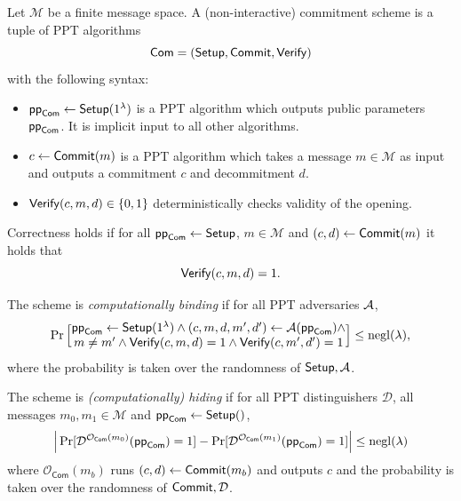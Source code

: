 \begin{definition}\label{def:commitment-scheme}
Let $\mathcal{M}$ be a finite message space. A (non-interactive) commitment scheme is a tuple of PPT algorithms
\[
  \mathsf{Com}=(\mathsf{Setup},\mathsf{Commit},\mathsf{Verify})
\]
with the following syntax:
\begin{itemize}[leftmargin=1.25em]
  \item $\mathsf{pp}_{\mathsf{Com}}\gets \mathsf{Setup}(1^\lambda)$ is a PPT algorithm which outputs public parameters $\mathsf{pp}_{\mathsf{Com}}$. It is implicit input to all other algorithms.
  \item $c \gets \mathsf{Commit}(m)$ is a PPT algorithm which takes a message $m\in\mathcal{M}$ as input and outputs a commitment $c$ and decommitment $d$.
  \item $\mathsf{Verify}(c,m,d)\in\{0,1\}$ deterministically checks validity of the opening.
\end{itemize}
Correctness holds if for all $\mathsf{pp}_{\mathsf{Com}}\gets \mathsf{Setup}$,  $m\in \mathcal{M}$ and $(c,d)\gets \mathsf{Commit}(m)$ it holds that
\[
  \mathsf{Verify}(c,m,d)=1.
\]

The scheme is \emph{computationally binding} if for all PPT adversaries $\mathcal{A}$,
\[
  \Pr\Big[\begin{matrix}
  	\mathsf{pp}_{\mathsf{Com}} \gets \mathsf{Setup}(1^\lambda) \wedge (c,m,d,m',d')\gets \mathcal{A}(\mathsf{pp}_{\mathsf{Com}}) \wedge  \\
  	m\neq m' \wedge \mathsf{Verify}(c,m,d)=1 \wedge \mathsf{Verify}(c,m',d')=1
  \end{matrix}
   \Big]\le \mathrm{negl}(\lambda),
\]
where the probability is taken over the randomness of $\mathsf{Setup},\mathcal{A}$.

The scheme is \emph{(computationally) hiding} if for all PPT distinguishers $\mathcal{D}$, all 
messages $m_0,m_1\in\mathcal{M}$ and $\mathsf{pp}_{\mathsf{Com}}\gets \mathsf{Setup}()$,
\[
  \Big|\Pr[\mathcal{D}^{\mathcal{O}_{\mathsf{Com}}(m_0)}(\mathsf{pp}_{\mathsf{Com}})=1]
  -\Pr[\mathcal{D}^{\mathcal{O}_{\mathsf{Com}}(m_1)}(\mathsf{pp}_{\mathsf{Com}})=1]\Big|\le \mathrm{negl}(\lambda)
\]
where $\mathcal{O}_{\mathsf{Com}}(m_b)$ runs $(c,d)\gets \mathsf{Commit}(m_b)$ and outputs $c$ and the probability is taken over the randomness of $\mathsf{Commit},\mathcal{D}$.
\end{definition}


